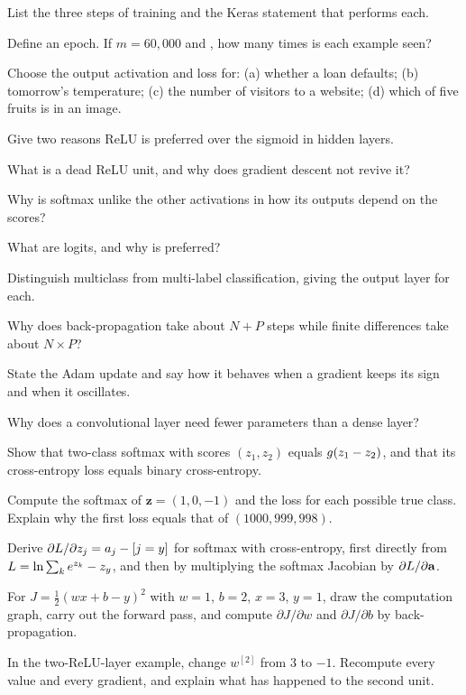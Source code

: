
\sq List the three steps of training and the Keras statement that performs each.

\sq Define an epoch. If $m = 60{,}000$ and , how many times is each
example seen?

\sq Choose the output activation and loss for: (a) whether a loan defaults;
(b) tomorrow's temperature; (c) the number of visitors to a website; (d) which
of five fruits is in an image.

\sq Give two reasons ReLU is preferred over the sigmoid in hidden layers.

\sq What is a dead ReLU unit, and why does gradient descent not revive it?

\sq Why is softmax unlike the other activations in how its outputs depend on the
scores?

\sq What are logits, and why is  preferred?

\sq Distinguish multiclass from multi-label classification, giving the output
layer for each.

\sq Why does back-propagation take about $N + P$ steps while finite differences
take about $N\times P$?

\sq State the Adam update and say how it behaves when a gradient keeps its sign
and when it oscillates.

\sq Why does a convolutional layer need fewer parameters than a dense layer?


\ap Show that two-class softmax with scores $(z_1, z_2)$ equals
$g(z_1 - z_2)$, and that its cross-entropy loss equals binary cross-entropy.

\ap Compute the softmax of $\mathbf{z} = (1, 0, -1)$ and the loss for each
possible true class. Explain why the first loss equals that of
$(1000, 999, 998)$.

\ap Derive $\partial L/\partial z_j = a_j - [j = y]$ for softmax with
cross-entropy, first directly from $L = \ln\sum_k e^{z_k} - z_y$, and then
by multiplying the softmax Jacobian by $\partial L/\partial\mathbf{a}$.

\ap For $J = \frac12(wx + b - y)^2$ with $w = 1$, $b = 2$, $x = 3$, $y = 1$, draw
the computation graph, carry out the forward pass, and compute
$\partial J/\partial w$ and $\partial J/\partial b$ by back-propagation.

\ap In the two-ReLU-layer example, change $w^{[2]}$ from $3$ to $-1$. Recompute
every value and every gradient, and explain what has happened to the second
unit.

